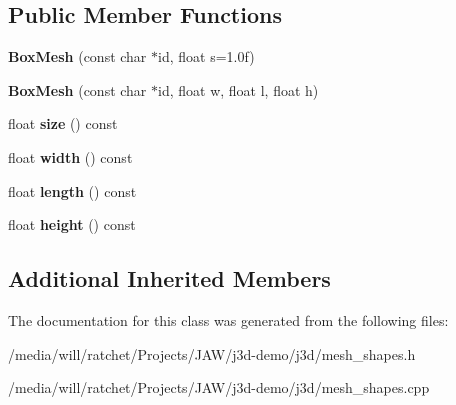\subsection*{Public Member Functions}
\begin{DoxyCompactItemize}
\item 
\hypertarget{classj3d_1_1BoxMesh_aa861551665f85cf83c18641d4b9e8bbf}{}{\bfseries Box\+Mesh} (const char $\ast$id, float s=1.\+0f)\label{classj3d_1_1BoxMesh_aa861551665f85cf83c18641d4b9e8bbf}

\item 
\hypertarget{classj3d_1_1BoxMesh_a85c6d0c1e9c3591a931c0d2c1d0c7af7}{}{\bfseries Box\+Mesh} (const char $\ast$id, float w, float l, float h)\label{classj3d_1_1BoxMesh_a85c6d0c1e9c3591a931c0d2c1d0c7af7}

\item 
\hypertarget{classj3d_1_1BoxMesh_a618cb439ab083e1ad5904181c50524ff}{}float {\bfseries size} () const \label{classj3d_1_1BoxMesh_a618cb439ab083e1ad5904181c50524ff}

\item 
\hypertarget{classj3d_1_1BoxMesh_ade973a1b8aa666e0eec946e79d053222}{}float {\bfseries width} () const \label{classj3d_1_1BoxMesh_ade973a1b8aa666e0eec946e79d053222}

\item 
\hypertarget{classj3d_1_1BoxMesh_a2f8d53a1d40fec083ddc74aa53b669c0}{}float {\bfseries length} () const \label{classj3d_1_1BoxMesh_a2f8d53a1d40fec083ddc74aa53b669c0}

\item 
\hypertarget{classj3d_1_1BoxMesh_a38e97c51f1e01240f170a73835305fd3}{}float {\bfseries height} () const \label{classj3d_1_1BoxMesh_a38e97c51f1e01240f170a73835305fd3}

\end{DoxyCompactItemize}
\subsection*{Additional Inherited Members}


The documentation for this class was generated from the following files\+:\begin{DoxyCompactItemize}
\item 
/media/will/ratchet/\+Projects/\+J\+A\+W/j3d-\/demo/j3d/mesh\+\_\+shapes.\+h\item 
/media/will/ratchet/\+Projects/\+J\+A\+W/j3d-\/demo/j3d/mesh\+\_\+shapes.\+cpp\end{DoxyCompactItemize}
